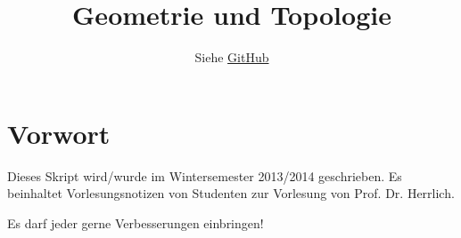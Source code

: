 \documentclass[a4paper,oneside,DIV15,BCOR12mm]{scrbook}
\author{Siehe \href{https://github.com/MartinThoma/LaTeX-examples/tree/master/documents}{GitHub}}
\title{Geometrie und Topologie}
\begin{document}
\maketitle

\renewcommand{\thechapter}{\Roman{chapter}}
\tableofcontents

\chapter*{Vorwort}
Dieses Skript wird/wurde im Wintersemester 2013/2014 geschrieben.
Es beinhaltet Vorlesungsnotizen von Studenten zur Vorlesung von
Prof. Dr. Herrlich.

Es darf jeder gerne Verbesserungen einbringen!


\appendix

\renewcommand{\indexname}{Stichwortverzeichnis}
\printindex
\end{document}
